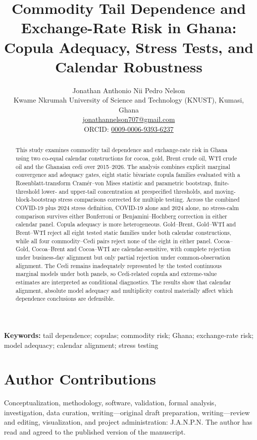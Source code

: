 \documentclass[11pt]{article}
\title{Commodity Tail Dependence and Exchange-Rate Risk in Ghana:\\
Copula Adequacy, Stress Tests, and Calendar Robustness}
\author{Jonathan Anthonio Nii Pedro Nelson\\Kwame Nkrumah University of Science and Technology (KNUST), Kumasi, Ghana\\\href{mailto:jonathannelson707@gmail.com}{jonathannelson707@gmail.com}\\ORCID: \href{https://orcid.org/0009-0006-9393-6237}{0009-0006-9393-6237}}
\date{}
\begin{document}
\maketitle

\begin{abstract}
This study examines commodity tail dependence and exchange-rate risk in Ghana using two co-equal calendar constructions for cocoa, gold, Brent crude oil, WTI crude oil and the Ghanaian cedi over 2015--2026. The analysis combines explicit marginal convergence and adequacy gates, eight static bivariate copula families evaluated with a Rosenblatt-transform Cramér--von Mises statistic and parametric bootstrap, finite-threshold lower- and upper-tail concentration at prespecified thresholds, and moving-block-bootstrap stress comparisons corrected for multiple testing. Across the combined COVID-19 plus 2024 stress definition, COVID-19 alone and 2024 alone, no stress-calm comparison survives either Bonferroni or Benjamini--Hochberg correction in either calendar panel. Copula adequacy is more heterogeneous. Gold--Brent, Gold--WTI and Brent--WTI reject all eight tested static families under both calendar constructions, while all four commodity--Cedi pairs reject none of the eight in either panel. Cocoa--Gold, Cocoa--Brent and Cocoa--WTI are calendar-sensitive, with complete rejection under business-day alignment but only partial rejection under common-observation alignment. The Cedi remains inadequately represented by the tested continuous marginal models under both panels, so Cedi-related copula and extreme-value estimates are interpreted as conditional diagnostics. The results show that calendar alignment, absolute model adequacy and multiplicity control materially affect which dependence conclusions are defensible.
\end{abstract}

\noindent\textbf{Keywords:} tail dependence; copulas; commodity risk; Ghana; exchange-rate risk; model adequacy; calendar alignment; stress testing










\section*{Author Contributions}
Conceptualization, methodology, software, validation, formal analysis, investigation, data curation, writing---original draft preparation, writing---review and editing, visualization, and project administration: J.A.N.P.N. The author has read and agreed to the published version of the manuscript.
\end{document}
